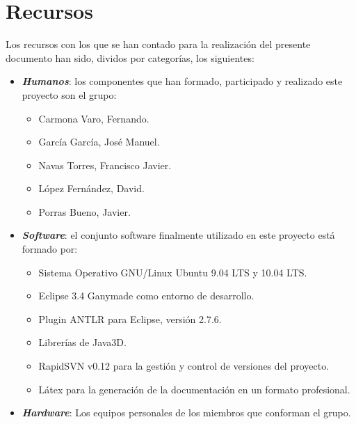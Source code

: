 \chapter{Recursos}
Los recursos con los que se han contado para la realización del presente documento han sido, dividos por categorías, los siguientes:
\begin{itemize}
   \item \textbf{\textit{Humanos}}: los componentes que han formado, participado y realizado este proyecto son el grupo:
         \begin{itemize}
            \item Carmona Varo, Fernando.
            \item García García, José Manuel.
            \item Navas Torres, Francisco Javier.
            \item López Fernández, David.
            \item Porras Bueno, Javier.
         \end{itemize}            
   \item \textbf{\textit{Software}}: el conjunto software finalmente utilizado en este proyecto está formado por:
         \begin{itemize}
            \item Sistema Operativo GNU/Linux Ubuntu 9.04 LTS y 10.04 LTS.
            \item Eclipse 3.4 Ganymade como entorno de desarrollo.
            \item Plugin ANTLR para Eclipse, versión 2.7.6.
            \item Librerías de Java3D.
            \item RapidSVN v0.12 para la gestión y control de versiones del proyecto.
            \item Látex para la generación de la documentación en un formato profesional.
         \end{itemize}
   \item \textbf{\textit{Hardware}}: Los equipos personales de los miembros que conforman el grupo. 
\end{itemize}
